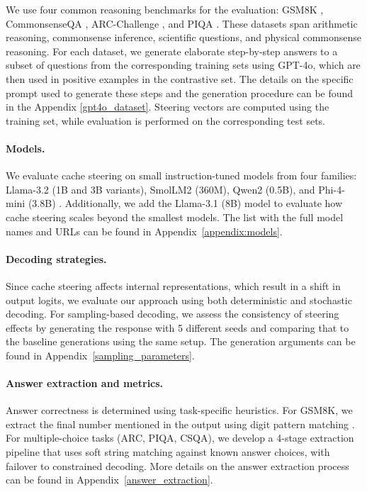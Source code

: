 \documentclass{article} %
\begin{document}
We use four common reasoning benchmarks for the evaluation: GSM8K \citep{cobbe2021training}, CommonsenseQA \citep{talmor2018commonsenseqa}, ARC-Challenge \citep{clark2018think}, and PIQA \citep{bisk2020piqa}. These datasets span arithmetic reasoning, commonsense inference, scientific questions, and physical commonsense reasoning. For each dataset, we generate elaborate step-by-step answers to a subset of questions from the corresponding training sets using GPT-4o, which are then used in positive examples in the contrastive set. The details on the specific prompt used to generate these steps and the generation procedure can be found in the Appendix \ref{gpt4o_dataset}. Steering vectors are computed using the training set, while evaluation is performed on the corresponding test sets. 

\paragraph{Models.}
We evaluate cache steering on small instruction-tuned models from four families: Llama-3.2 (1B and 3B variants), SmolLM2 (360M), Qwen2 (0.5B), and Phi-4-mini (3.8B) \citep{grattafiori2024llama, team2024qwen2, allal2025smollm2, abouelenin2025phi}. Additionally, we add the Llama-3.1 (8B) model to evaluate how cache steering scales beyond the smallest models. The list with the full model names and URLs can be found in Appendix~\ref{appendix:models}.

\paragraph{Decoding strategies.}

Since cache steering affects internal representations, which result in a shift in output logits, we evaluate our approach using both deterministic and stochastic decoding. For sampling-based decoding, we assess the consistency of steering effects by generating the response with 5 different seeds and comparing that to the baseline generations using the same setup. The generation arguments can be found in Appendix~\ref{sampling_parameters}.



\paragraph{Answer extraction and metrics.}

Answer correctness is determined using task-specific heuristics. For GSM8K, we extract the final number mentioned in the output using digit pattern matching \citep{wang2023far, wang2402chain}. For multiple-choice tasks (ARC, PIQA, CSQA), we develop a 4-stage extraction pipeline that uses soft string matching against known answer choices, with failover to constrained decoding. 
More details on the answer extraction process can be found in Appendix~\ref{answer_extraction}.
\end{document}

